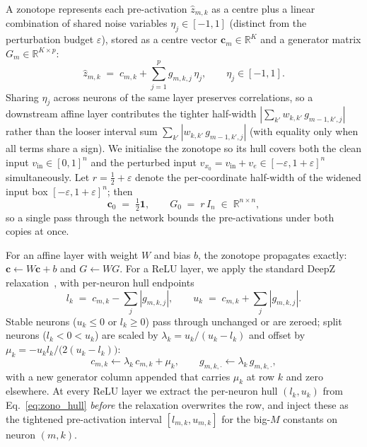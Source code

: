 \documentclass[11pt]{article}
\newcommand{\RR}{\mathbb{R}}
\newcommand{\ep}{\varepsilon}
\begin{document}
A zonotope represents each pre-activation $\hat z_{m,k}$ as a centre plus a linear combination of shared noise variables $\eta_j \in [-1, 1]$ (distinct from the perturbation budget $\ep$), stored as a centre vector $\mathbf c_m \in \RR^K$ and a generator matrix $G_m \in \RR^{K \times p}$:
\begin{equation}
  \hat z_{m,k} \;=\; c_{m,k} + \textstyle\sum_{j=1}^{p} g_{m,k,j}\, \eta_j,
  \qquad
  \eta_j \in [-1, 1].
  \label{eq:zono_rep}
\end{equation}
Sharing $\eta_j$ across neurons of the same layer preserves correlations, so a downstream affine layer contributes the tighter half-width $|\sum_{k'} w_{k,k'}\, g_{m-1,k',j}|$ rather than the looser interval sum $\sum_{k'} |w_{k,k'}\, g_{m-1,k',j}|$ (with equality only when all terms share a sign). We initialise the zonotope so its hull covers both the clean input $v_\mathrm{in} \in [0, 1]^n$ and the perturbed input $v_{x_0} = v_\mathrm{in} + v_e \in [-\ep, 1+\ep]^n$ simultaneously. Let $r = \tfrac{1}{2} + \ep$ denote the per-coordinate half-width of the widened input box $[-\ep, 1+\ep]^n$; then
\begin{equation}
  \mathbf{c}_0 \;=\; \tfrac{1}{2}\mathbf{1},
  \qquad
  G_0 \;=\; r\, I_n \;\in\; \RR^{n \times n},
  \label{eq:zono_init}
\end{equation}
so a single pass through the network bounds the pre-activations under both copies at once.

For an affine layer with weight $W$ and bias $b$, the zonotope propagates exactly: $\mathbf c \leftarrow W \mathbf c + b$ and $G \leftarrow W G$. For a ReLU layer, we apply the standard DeepZ relaxation~\cite{singh2018fast}, with per-neuron hull endpoints
\begin{equation}
  l_k \;=\; c_{m,k} - \textstyle\sum_j |g_{m,k,j}|,
  \qquad
  u_k \;=\; c_{m,k} + \textstyle\sum_j |g_{m,k,j}|.
  \label{eq:zono_hull}
\end{equation}
Stable neurons ($u_k \le 0$ or $l_k \ge 0$) pass through unchanged or are zeroed; split neurons ($l_k < 0 < u_k$) are scaled by $\lambda_k = u_k / (u_k - l_k)$ and offset by $\mu_k = -u_k l_k / \bigl(2(u_k - l_k)\bigr)$:
\begin{equation}
  c_{m,k} \leftarrow \lambda_k\, c_{m,k} + \mu_k,
  \qquad
  g_{m,k,\cdot} \leftarrow \lambda_k\, g_{m,k,\cdot},
  \label{eq:zono_relu}
\end{equation}
with a new generator column appended that carries $\mu_k$ at row $k$ and zero elsewhere. At every ReLU layer we extract the per-neuron hull $(l_k, u_k)$ from Eq.~\eqref{eq:zono_hull} \emph{before} the relaxation overwrites the row, and inject these as the tightened pre-activation interval $[l_{m,k}, u_{m,k}]$ for the big-$M$ constants on neuron $(m,k)$.
\end{document}
